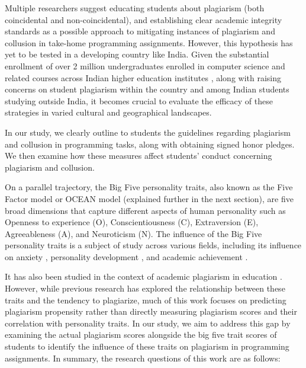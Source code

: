 Multiple researchers suggest educating students about plagiarism (both coincidental and non-coincidental), and establishing clear academic integrity standards as a possible approach to mitigating instances of plagiarism and collusion in take-home programming assignments\cite{10.1145/3506717, 10.1145/2591708.2591755, 10.1145/2632320.2632342, Joy2011SourceCP}. However, this hypothesis has yet to be tested in a developing country like India. Given the substantial enrollment of over 2 million undergraduates enrolled in computer science and related courses across Indian higher education institutes \cite{departmentofhighereducationgovernmentofindiaAllIndiaSurvey2021}, along with raising concerns on student plagiarism within the country\cite{bakthavatchaalam2021academic} and among Indian students studying outside India\cite{plagiairmInIndia}, it becomes crucial to evaluate the efficacy of these strategies in varied cultural and geographical landscapes.

In our study, we clearly outline to students the guidelines regarding plagiarism and collusion in programming tasks, along with obtaining signed honor pledges. We then examine how these measures affect students' conduct concerning plagiarism and collusion.

On a parallel trajectory, the Big Five personality traits, also known as the Five Factor model or OCEAN model (explained further in the next section), are five broad dimensions that capture different aspects of human personality such as Openness to experience (O), Conscientiousness (C), Extraversion (E), Agreeableness (A), and Neuroticism (N). The influence of the Big Five personality traits is a subject of study across various fields, including its influence on anxiety \cite{AnxityBigfive}, personality development \cite{Tetzner}, and academic achievement \cite{AchievementBigfive, https://doi.org/10.1111/jopy.12663, OZ2015PER}. 

It has also been studied in the context of academic plagiarism in education \cite{Giluk2015BigFP, Bhutto2019ACS}. However, while previous research has explored the relationship between these traits and the tendency to plagiarize, much of this work focuses on predicting plagiarism propensity rather than directly measuring plagiarism scores and their correlation with personality traits. In our study, we aim to address this gap by examining the actual plagiarism scores alongside the big five trait scores of students to identify the influence of these traits on plagiarism in programming assignments. In summary, the research questions of this work are as follows:

